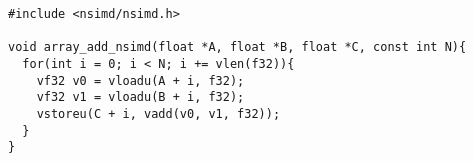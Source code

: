 \begin{lstlisting}[frame=single]
#include <nsimd/nsimd.h>

void array_add_nsimd(float *A, float *B, float *C, const int N){
  for(int i = 0; i < N; i += vlen(f32)){
    vf32 v0 = vloadu(A + i, f32);
    vf32 v1 = vloadu(B + i, f32);
    vstoreu(C + i, vadd(v0, v1, f32));
  }
}
\end{lstlisting}